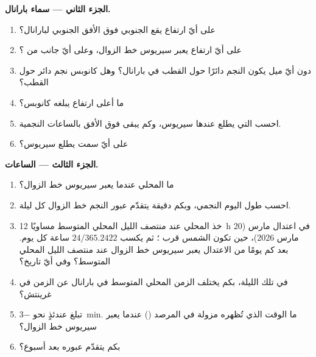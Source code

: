 \begin{problem}
\medskip
\noindent\textbf{الجزء الثاني --- سماء بارانال.}
\begin{enumerate}[resume]
  \item على أيّ ارتفاع يقع  الجنوبي فوق الأفق الجنوبي لبارانال؟
  \item على أيّ ارتفاع يعبر سيريوس خط الزوال، وعلى أيّ جانب من ؟
  \item دون أيّ ميل يكون النجم دائرًا حول القطب في بارانال؟ وهل كانوبس نجم دائر حول القطب؟
  \item ما أعلى ارتفاع يبلغه كانوبس؟
  \item احسب  التي يطلع عندها سيريوس، وكم يبقى فوق الأفق بالساعات النجمية.
  \item على أيّ سمت يطلع سيريوس؟
\end{enumerate}

\medskip
\noindent\textbf{الجزء الثالث --- الساعات.}
\begin{enumerate}[resume]
  \item ما  المحلي عندما يعبر سيريوس خط الزوال؟
  \item احسب طول اليوم النجمي، وبكم دقيقة يتقدّم عبور النجم خط الزوال كل ليلة.
  \item خذ  المحلي عند منتصف الليل المحلي المتوسط مساويًا \qty{12}{h} في اعتدال مارس (20 مارس 2026)، حين تكون الشمس قرب ؛ ثم يكسب  $24/365.2422$ ساعة كل يوم. بعد كم يومًا من الاعتدال يعبر سيريوس خط الزوال عند منتصف الليل المحلي المتوسط؟ وفي أيّ تاريخ؟
  \item في تلك الليلة، بكم يختلف الزمن المحلي المتوسط في بارانال عن الزمن في غرينتش؟
  \item تبلغ  عندئذٍ نحو \qty{-3}{min}. ما الوقت الذي تُظهره مزولة في المرصد () عندما يعبر سيريوس خط الزوال؟
  \item بكم يتقدّم عبوره بعد أسبوع؟
\end{enumerate}


\end{problem}
